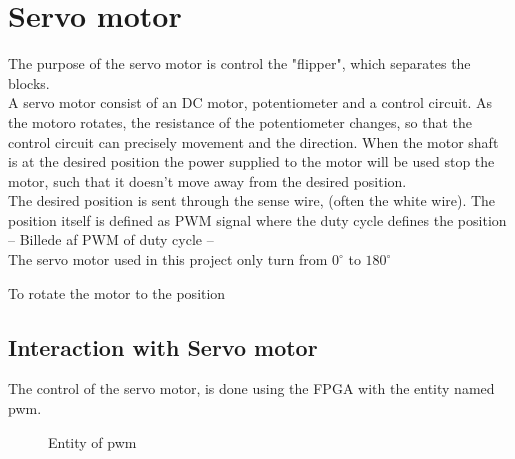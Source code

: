 \section{Servo motor}
The purpose of the servo motor is control the "flipper", which separates the blocks. \\


A servo motor consist of an DC motor, potentiometer and a control circuit.  As the motoro rotates, the resistance of the potentiometer changes,  so that the control circuit can precisely movement and the direction.   When the motor shaft is at the desired position the power supplied to the motor will be used stop the motor, such that it doesn't move away from the desired position. \\

The desired position is sent through the sense wire, (often the white wire). The position  itself is defined as PWM signal where the duty cycle defines the position\\
 

-- Billede af PWM of duty cycle --  \\

The servo motor used in this project only turn from $0^{\circ}$ to $180^{\circ}$

To rotate the motor to the position 
\subsection{Interaction with Servo motor}
The control of the servo motor, is done using the FPGA with the entity named pwm. 

\begin{figure}[htb]
\centering
{}
\caption{Entity of pwm}
\end{figure}